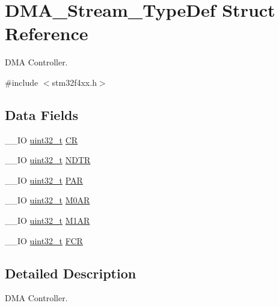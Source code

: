 \hypertarget{struct_d_m_a___stream___type_def}{\section{D\-M\-A\-\_\-\-Stream\-\_\-\-Type\-Def Struct Reference}
\label{struct_d_m_a___stream___type_def}
}


D\-M\-A Controller.  




{\ttfamily \#include $<$stm32f4xx.\-h$>$}

\subsection*{Data Fields}
\begin{DoxyCompactItemize}
\item 
\-\_\-\-\_\-\-I\-O \hyperlink{stdint_8h_a435d1572bf3f880d55459d9805097f62}{uint32\-\_\-t} \hyperlink{struct_d_m_a___stream___type_def_af893adc5e821b15d813237b2bfe4378b}{C\-R}
\item 
\-\_\-\-\_\-\-I\-O \hyperlink{stdint_8h_a435d1572bf3f880d55459d9805097f62}{uint32\-\_\-t} \hyperlink{struct_d_m_a___stream___type_def_a2cc2a52628182f9e79ab1e49bb78a1eb}{N\-D\-T\-R}
\item 
\-\_\-\-\_\-\-I\-O \hyperlink{stdint_8h_a435d1572bf3f880d55459d9805097f62}{uint32\-\_\-t} \hyperlink{struct_d_m_a___stream___type_def_adbeac1d47cb85ab52dac71d520273947}{P\-A\-R}
\item 
\-\_\-\-\_\-\-I\-O \hyperlink{stdint_8h_a435d1572bf3f880d55459d9805097f62}{uint32\-\_\-t} \hyperlink{struct_d_m_a___stream___type_def_a965da718db7d0303bff185d367d96fd6}{M0\-A\-R}
\item 
\-\_\-\-\_\-\-I\-O \hyperlink{stdint_8h_a435d1572bf3f880d55459d9805097f62}{uint32\-\_\-t} \hyperlink{struct_d_m_a___stream___type_def_a142ca5a1145ba9cf4cfa557655af1c13}{M1\-A\-R}
\item 
\-\_\-\-\_\-\-I\-O \hyperlink{stdint_8h_a435d1572bf3f880d55459d9805097f62}{uint32\-\_\-t} \hyperlink{struct_d_m_a___stream___type_def_aad3d78ab35e7af48951be5be53392f9f}{F\-C\-R}
\end{DoxyCompactItemize}


\subsection{Detailed Description}
D\-M\-A Controller. 

